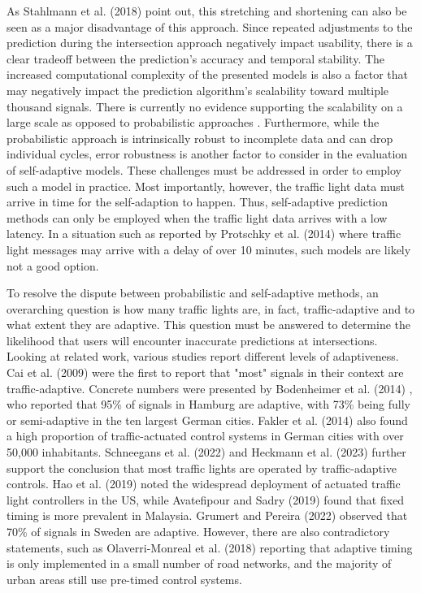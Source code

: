 As Stahlmann et al. (2018) \cite{stahlmann_exploring_2018} point out, this stretching and shortening can also be seen as a major disadvantage of this approach. Since repeated adjustments to the prediction during the intersection approach negatively impact usability, there is a clear tradeoff between the prediction's accuracy and temporal stability. The increased computational complexity of the presented models is also a factor that may negatively impact the prediction algorithm's scalability toward multiple thousand signals. There is currently no evidence supporting the scalability on a large scale as opposed to probabilistic approaches \cite{protschky_extensive_2014, protschky_adaptive_2014}. Furthermore, while the probabilistic approach is intrinsically robust to incomplete data and can drop individual cycles, error robustness is another factor to consider in the evaluation of self-adaptive models. These challenges must be addressed in order to employ such a model in practice. Most importantly, however, the traffic light data must arrive in time for the self-adaption to happen. Thus, self-adaptive prediction methods can only be employed when the traffic light data arrives with a low latency. In a situation such as reported by Protschky et al. (2014) \cite{protschky_extensive_2014, protschky_adaptive_2014} where traffic light messages may arrive with a delay of over 10 minutes, such models are likely not a good option.

To resolve the dispute between probabilistic and self-adaptive methods, an overarching question is how many traffic lights are, in fact, traffic-adaptive and to what extent they are adaptive. This question must be answered to determine the likelihood that users will encounter inaccurate predictions at intersections. Looking at related work, various studies report different levels of adaptiveness. Cai et al. (2009) \cite{cai_adaptive_2009} were the first to report that "most" signals in their context are traffic-adaptive. Concrete numbers were presented by Bodenheimer et al. (2014) \cite{bodenheimer_enabling_2014}, who reported that 95\% of signals in Hamburg are adaptive, with 73\% being fully or semi-adaptive in the ten largest German cities. Fakler et al. (2014) \cite{fakler_structures_2014} also found a high proportion of traffic-actuated control systems in German cities with over 50,000 inhabitants. Schneegans et al. (2022) \cite{scheegans_exploiting_2022} and Heckmann et al. (2023) \cite{heckmann_stage_2023} further support the conclusion that most traffic lights are operated by traffic-adaptive controls. Hao et al. (2019) \cite{hao_eco-approach_2019} noted the widespread deployment of actuated traffic light controllers in the US, while Avatefipour and Sadry (2019) \cite{avatefipour_traffic_2018} found that fixed timing is more prevalent in Malaysia. Grumert and Pereira (2022) \cite{grumert_heads-up_2022} observed that 70\% of signals in Sweden are adaptive. However, there are also contradictory statements, such as Olaverri-Monreal et al. (2018) \cite{olaverri-monreal_implementation_2018} reporting that adaptive timing is only implemented in a small number of road networks, and the majority of urban areas still use pre-timed control systems.

